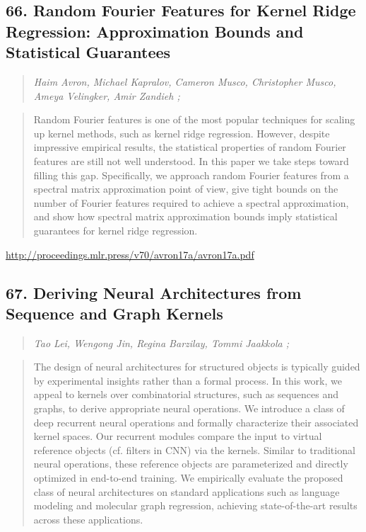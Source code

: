 \documentclass{article}
\begin{document}
\subsection{66. Random Fourier Features for Kernel Ridge Regression: Approximation Bounds and Statistical Guarantees}

\begin{quote}
\footnotesize{\textit{Haim Avron, Michael Kapralov, Cameron Musco, Christopher Musco, Ameya Velingker, Amir Zandieh ;}}
\end{quote}

\begin{quote}
    Random Fourier features is one of the most popular techniques for scaling up kernel methods, such as kernel ridge regression. However, despite impressive empirical results, the statistical properties of random Fourier features are still not well understood. In this paper we take steps toward filling this gap. Specifically, we approach random Fourier features from a spectral matrix approximation point of view, give tight bounds on the number of Fourier features required to achieve a spectral approximation, and show how spectral matrix approximation bounds imply statistical guarantees for kernel ridge regression.  \end{quote}

\href{http://proceedings.mlr.press/v70/avron17a/avron17a.pdf}{http://proceedings.mlr.press/v70/avron17a/avron17a.pdf}

\subsection{67. Deriving Neural Architectures from Sequence and Graph Kernels}

\begin{quote}
\footnotesize{\textit{Tao Lei, Wengong Jin, Regina Barzilay, Tommi Jaakkola ;}}
\end{quote}

\begin{quote}
    The design of neural architectures for structured objects is typically guided by experimental insights rather than a formal process. In this work, we appeal to kernels over combinatorial structures, such as sequences and graphs, to derive appropriate neural operations. We introduce a class of deep recurrent neural operations and formally characterize their associated kernel spaces. Our recurrent modules compare the input to virtual reference objects (cf. filters in CNN) via the kernels. Similar to traditional neural operations, these reference objects are parameterized and directly optimized in end-to-end training. We empirically evaluate the proposed class of neural architectures on standard applications such as language modeling and molecular graph regression, achieving state-of-the-art results across these applications.  \end{quote}
\end{document}
